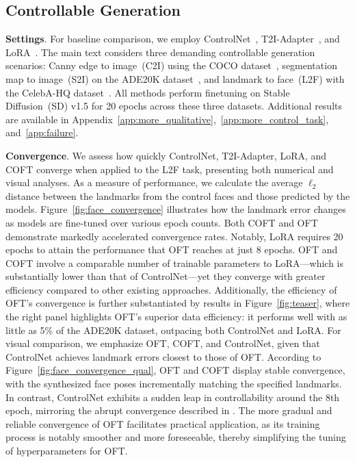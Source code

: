 \subsection{Controllable Generation}

\textbf{Settings}. For baseline comparison, we employ ControlNet~\cite{zhang2023adding}, T2I-Adapter~\cite{mou2023t2i}, and LoRA~\cite{hulora2022}. The main text considers three demanding controllable generation scenarios: Canny edge to image~(C2I) using the COCO dataset~\cite{lin2014microsoft}, segmentation map to image~(S2I) on the ADE20K dataset~\cite{zhou2017scene}, and landmark to face~(L2F) with the CelebA-HQ dataset~\cite{karras2018progressive,xia2021tedigan}. All methods perform finetuning on Stable Diffusion~(SD) v1.5 for 20 epochs across these three datasets. Additional results are available in Appendix~\ref{app:more_qualitative},~\ref{app:more_control_task}, and~\ref{app:failure}.

\textbf{Convergence}. We assess how quickly ControlNet, T2I-Adapter, LoRA, and COFT converge when applied to the L2F task, presenting both numerical and visual analyses. As a measure of performance, we calculate the average $\ell_2$ distance between the landmarks from the control faces and those predicted by the models. Figure~\ref{fig:face_convergence} illustrates how the landmark error changes as models are fine-tuned over various epoch counts. Both COFT and OFT demonstrate markedly accelerated convergence rates. Notably, LoRA requires 20 epochs to attain the performance that OFT reaches at just 8 epochs. OFT and COFT involve a comparable number of trainable parameters to LoRA—which is substantially lower than that of ControlNet—yet they converge with greater efficiency compared to other existing approaches. Additionally, the efficiency of OFT's convergence is further substantiated by results in Figure~\ref{fig:teaser}, where the right panel highlights OFT’s superior data efficiency: it performs well with as little as 5\% of the ADE20K dataset, outpacing both ControlNet and LoRA. For visual comparison, we emphasize OFT, COFT, and ControlNet, given that ControlNet achieves landmark errors closest to those of OFT. According to Figure~\ref{fig:face_convergence_qual}, OFT and COFT display stable convergence, with the synthesized face poses incrementally matching the specified landmarks. In contrast, ControlNet exhibits a sudden leap in controllability around the 8th epoch, mirroring the abrupt convergence described in \cite{zhang2023adding}. The more gradual and reliable convergence of OFT facilitates practical application, as its training process is notably smoother and more foreseeable, thereby simplifying the tuning of hyperparameters for OFT.

